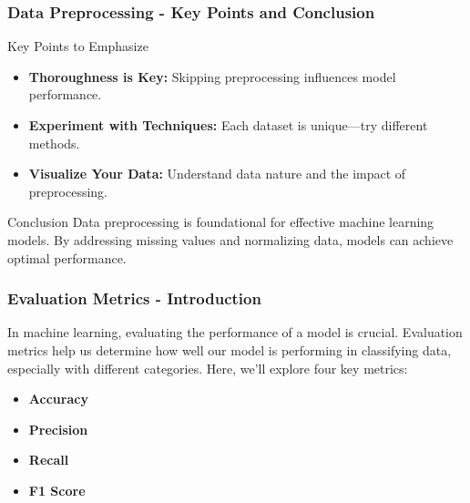 \documentclass[aspectratio=169]{beamer}
\begin{document}
\begin{frame}[fragile]
    \frametitle{Data Preprocessing - Key Points and Conclusion}
    \begin{block}{Key Points to Emphasize}
        \begin{itemize}
            \item \textbf{Thoroughness is Key:} Skipping preprocessing influences model performance.
            \item \textbf{Experiment with Techniques:} Each dataset is unique—try different methods.
            \item \textbf{Visualize Your Data:} Understand data nature and the impact of preprocessing.
        \end{itemize}
    \end{block}
    
    \begin{block}{Conclusion}
        Data preprocessing is foundational for effective machine learning models. By addressing missing values and normalizing data, models can achieve optimal performance.
    \end{block}
\end{frame}

\begin{frame}[fragile]
    \frametitle{Evaluation Metrics - Introduction}
    In machine learning, evaluating the performance of a model is crucial. Evaluation metrics help us determine how well our model is performing in classifying data, especially with different categories. Here, we’ll explore four key metrics: 
    \begin{itemize}
        \item \textbf{Accuracy}
        \item \textbf{Precision}
        \item \textbf{Recall}
        \item \textbf{F1 Score}
    \end{itemize}
\end{frame}
\end{document}

